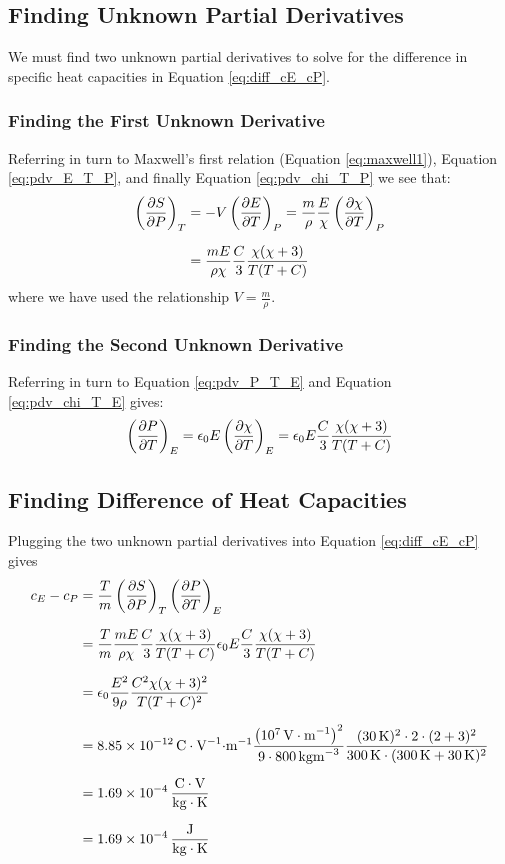 \documentclass[11pt, a4paper]{article}
\begin{document}
\subsection*{Finding Unknown Partial Derivatives}
We must find two unknown partial derivatives to solve for the difference in specific heat capacities in Equation \ref{eq:diff_cE_cP}.
\subsubsection*{Finding the First Unknown Derivative}
Referring in turn to Maxwell's first relation (Equation \ref{eq:maxwell1}), Equation \ref{eq:pdv_E_T_P}, and finally Equation \ref{eq:pdv_chi_T_P} we see that:
\begin{align*}
	\left(\pdv{S}{P}\right)_T  & = -V \left(\pdv{E}{T}\right)_P = \frac{m}{\rho} \frac{E}{\chi} \left(\pdv{\chi}{T}\right)_P \\[1.5ex]
	& =  \frac{mE}{\rho \chi} \frac{C}{3} \frac{ \chi (\chi + 3)}{T(T + C)}
\end{align*}
where we have used the relationship $ V = \frac{m}{\rho} $.

\subsubsection*{Finding the Second Unknown Derivative}
Referring in turn to Equation \ref{eq:pdv_P_T_E} and Equation \ref{eq:pdv_chi_T_E} gives:
\begin{align*}
	\left(\pdv{P}{T}\right)_E = \epsilon_0 E \left(\pdv{\chi}{T}\right)_E = \epsilon_0 E \frac{C}{3} \frac{ \chi (\chi + 3)}{T(T + C)}
\end{align*}

\subsection*{Finding Difference of Heat Capacities}
Plugging the two unknown partial derivatives into Equation \ref{eq:diff_cE_cP} gives
\begin{align*}
	 c_E - c_P & = \frac{T}{m} \left(\pdv{S}{P}\right)_T  \left(\pdv{P}{T}\right)_E \\[1.5ex]
	 & = \frac{T}{m} \frac{mE}{\rho \chi} \frac{C}{3} \frac{ \chi (\chi + 3)}{T(T + C)} \epsilon_0 E \frac{C}{3} \frac{ \chi (\chi + 3)}{T(T + C)} \\[1.5ex]
	 & = \epsilon_0 \frac{E^2}{9 \rho} \frac{C^2 \chi (\chi + 3)^2}{T (T + C)^2} \\[1.5ex]
	 & = \SI{8.85e-12}{C\cdot V^{-1}\cdot m^{-1}}  \frac{\left(\SI{e7}{V \cdot  m^{-1}}\right)^2}{9 \cdot \SI{800}{kg m^{-3}}} \frac{(\SI{30}{K})^2 \cdot 2 \cdot (2 + 3)^2}{\SI{300}{K} \cdot (\SI{300}{K} + \SI{30}{K})^2} \\[1.5ex]
	 & = \SI{1.69e-4}{\frac{C \cdot V}{kg\cdot K}} \\[1.5ex]
	 & =  \SI{1.69e-4}{\frac{J}{kg\cdot K}} 
\end{align*}
\end{document}
